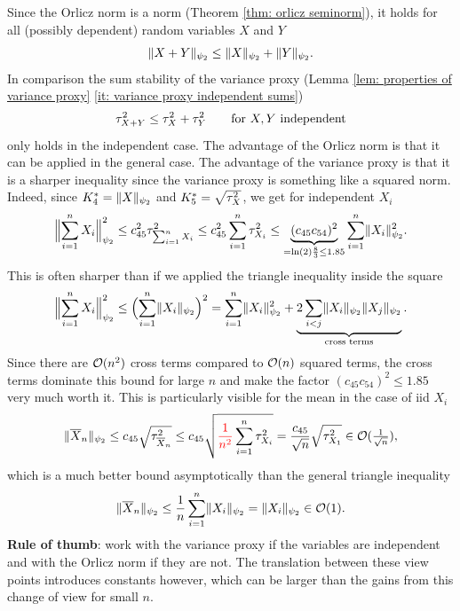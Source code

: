\begin{remark}
    Since the Orlicz norm is a norm
    (Theorem \ref{thm: orlicz seminorm}), it holds for all (possibly dependent)
    random variables \(X\) and \(Y\)
    \[
        \norm{X+Y}_{\psi_2} \le \norm{X}_{\psi_2} + \norm{Y}_{\psi_2}.
    \]
    In comparison the sum stability of the variance proxy (Lemma \ref{lem: properties of variance proxy} \ref{it: variance proxy independent sums})
    \[
        \varProx{X+Y} \le \varProx{X} + \varProx{Y}
        \qquad \text{for } X, Y \text{ independent}
    \]
    only holds in the independent case.
    The advantage of the Orlicz norm is that it can be applied in the general case.
    The advantage of the variance proxy is that it is a sharper inequality since the
    variance proxy is something like a squared norm. Indeed,
    since \(K_4^* = \norm{X}_{\psi_2}\) and \(K_5^* = \sqrt{\varProx{X}}\),
    we get for independent \(X_i\)
    \[
        \norm[\Big]{\sum_{i=1}^n X_i}_{\psi_2}^2
        \le c_{45}^2 \varProx{\sum_{i=1}^n X_i}
        \le c_{45}^2 \sum_{i=1}^n \varProx{X_i}
        \le \underbrace{(c_{45}c_{54})^2}_{=\ln(2)\frac83 \le 1.85} \sum_{i=1}^n \norm{X_i}_{\psi_2}^2.
    \]
    This is often sharper than if we applied the triangle inequality inside the square
    \[
        \norm[\Big]{\sum_{i=1}^n X_i}_{\psi_2}^2 \le \Bigl(\sum_{i=1}^n \norm{X_i}_{\psi_2}\Bigr)^2
        = \sum_{i=1}^n \norm{X_i}_{\psi_2}^2 + \underbrace{2\sum_{i<j} \norm{X_i}_{\psi_2}\norm{X_j}_{\psi_2}}_{\text{cross terms}}.
    \]
    Since there are \(\bigO(n^2)\) cross terms compared to \(\bigO(n)\) squared
    terms, the cross terms dominate this bound for large \(n\) and
    make the factor \((c_{45}c_{54})^2 \le 1.85\) very much worth it.
    This is particularly visible for the mean in
    the case of iid \(X_i\)
    \[
        \norm{\mean{X}_n}_{\psi_2}
        \le c_{45} \sqrt{\varProx{\mean{X}_n}}
        \le c_{45} \sqrt{\red{\frac1{n^2}} \sum_{i=1}^n \varProx{X_i}}
        =  \frac{c_{45}}{\sqrt{n}} \sqrt{\varProx{X_1}}
        \in \bigO(\tfrac1{\sqrt{n}}),
    \]
    which is a much better bound asymptotically than the general triangle inequality
    \[
        \norm{\mean{X}_n}_{\psi_2} \le \frac1n \sum_{i=1}^n \norm{X_i}_{\psi_2} = \norm{X_i}_{\psi_2} \in \bigO(1).
    \]
    \textbf{Rule of thumb}: work with the variance proxy if the variables are independent
    and with the Orlicz norm if they are not. The translation between these view
    points introduces constants however, which can be larger than the gains from
    this change of view for small \(n\).
\end{remark}



